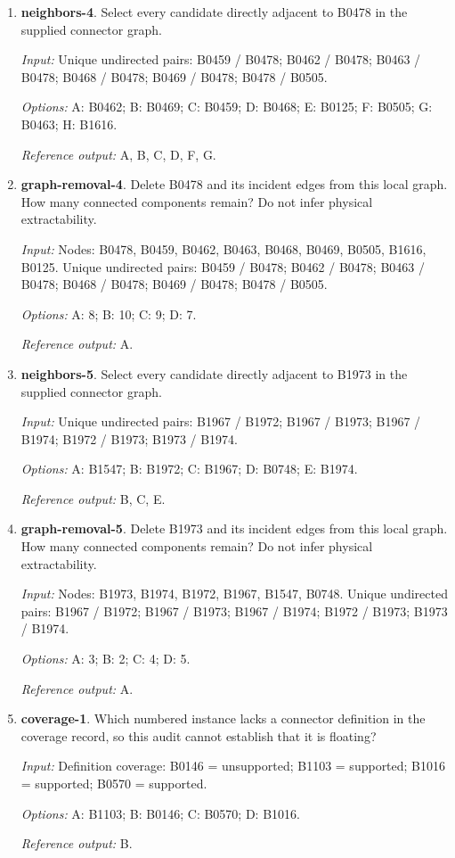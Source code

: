 \begin{enumerate}
\item \textbf{neighbors-4}. Select every candidate directly adjacent to B0478 in the supplied connector graph.\par {\small \textit{Input:} Unique undirected pairs: B0459 / B0478; B0462 / B0478; B0463 / B0478; B0468 / B0478; B0469 / B0478; B0478 / B0505. \par\textit{Options:} A: B0462; B: B0469; C: B0459; D: B0468; E: B0125; F: B0505; G: B0463; H: B1616. \par\textit{Reference output:} A, B, C, D, F, G.}
\item \textbf{graph-removal-4}. Delete B0478 and its incident edges from this local graph. How many connected components remain? Do not infer physical extractability.\par {\small \textit{Input:} Nodes: B0478, B0459, B0462, B0463, B0468, B0469, B0505, B1616, B0125. Unique undirected pairs: B0459 / B0478; B0462 / B0478; B0463 / B0478; B0468 / B0478; B0469 / B0478; B0478 / B0505. \par\textit{Options:} A: 8; B: 10; C: 9; D: 7. \par\textit{Reference output:} A.}
\item \textbf{neighbors-5}. Select every candidate directly adjacent to B1973 in the supplied connector graph.\par {\small \textit{Input:} Unique undirected pairs: B1967 / B1972; B1967 / B1973; B1967 / B1974; B1972 / B1973; B1973 / B1974. \par\textit{Options:} A: B1547; B: B1972; C: B1967; D: B0748; E: B1974. \par\textit{Reference output:} B, C, E.}
\item \textbf{graph-removal-5}. Delete B1973 and its incident edges from this local graph. How many connected components remain? Do not infer physical extractability.\par {\small \textit{Input:} Nodes: B1973, B1974, B1972, B1967, B1547, B0748. Unique undirected pairs: B1967 / B1972; B1967 / B1973; B1967 / B1974; B1972 / B1973; B1973 / B1974. \par\textit{Options:} A: 3; B: 2; C: 4; D: 5. \par\textit{Reference output:} A.}
\item \textbf{coverage-1}. Which numbered instance lacks a connector definition in the coverage record, so this audit cannot establish that it is floating?\par {\small \textit{Input:} Definition coverage: B0146 = unsupported; B1103 = supported; B1016 = supported; B0570 = supported. \par\textit{Options:} A: B1103; B: B0146; C: B0570; D: B1016. \par\textit{Reference output:} B.}

\end{enumerate}

